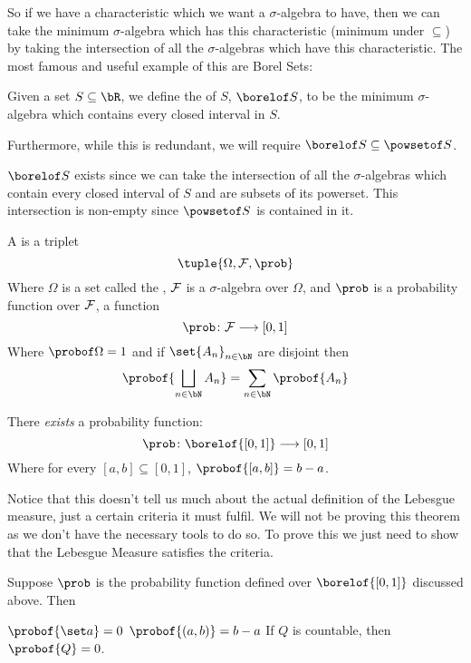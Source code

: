 So if we have a characteristic which we want a $\sigma$-algebra to have, then we can take the minimum $\sigma$-algebra
which has this characteristic (minimum under $\subseteq$) by taking the intersection of all the $\sigma$-algebras which
have this characteristic.
The most famous and useful example of this are Borel Sets:

\begin{defn*}

	Given a set $S\subseteq\bR$, we define the  of $S$, $\borelof S$, to be the minimum $\sigma$-algebra
	which contains every closed interval in $S$.

	Furthermore, while this is redundant, we will require $\borelof S\subseteq\powsetof S$.

\end{defn*}

$\borelof S$ exists since we can take the intersection of all the $\sigma$-algebras which contain every closed interval of
$S$ and are subsets of its powerset.
This intersection is non-empty since $\powsetof S$ is contained in it.

\begin{defn*}

	A  is a triplet
	\[ \tuple{\Omega, \cF, \prob} \]
	Where $\Omega$ is a set called the , ${\cal F}$ is a $\sigma$-algebra over $\Omega$, and $\prob$ is a
	probability function over ${\cal F}$, a function
	\[ \prob\colon\cF\longrightarrow[0,1] \]
	Where $\probof\Omega=1$ and if $\set{A_n}_{n\in\bN}$ are disjoint then
	\[ \probof{\bigsqcup_{n\in\bN}A_n} = \sum_{n\in\bN}\probof{A_n} \]

\end{defn*}

\begin{thrm*}

	There \emph{exists} a probability function:
	\[ \prob\colon\borelof{[0,1]}\longrightarrow[0,1] \]
	Where for every $[a,b]\subseteq[0,1]$, $\probof{[a,b]}=b-a$.

\end{thrm*}

Notice that this doesn't tell us much about the actual definition of the Lebesgue measure, just a certain criteria it must
fulfil.
We will not be proving this theorem as we don't have the necessary tools to do so.
To prove this we just need to show that the Lebesgue Measure satisfies the criteria.

\begin{prop*}

	Suppose $\prob$ is the probability function defined over $\borelof{[0,1]}$ discussed above.
	Then

	\begin{msecenumerate}
		\mitem $\probof{\set a}=0$
		\mitem $\probof{(a,b)}=b-a$
		\mitem If $Q$ is countable, then $\probof{Q}=0$.
	\end{msecenumerate}

\end{prop*}

